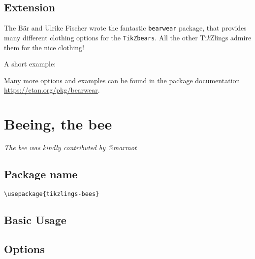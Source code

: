\documentclass[parskip=half]{scrartcl}
\newcommand{\tikzlings}{Ti\emph{k}Zlings\xspace}
\begin{document}
\subsection{Extension}

The B\"ar and Ulrike Fischer wrote the fantastic \lstinline|bearwear| package, that provides many different clothing options for the \lstinline|TikZbears|. All the other \tikzlings admire them for the nice clothing!

A short example:

\begin{tcblisting}{}
\bear
\bearwear[
  long sleeves, 
  shirt=red!80!black
]
\end{tcblisting}

Many more options and examples can be found in the package documentation \url{https://ctan.org/pkg/bearwear}. 

%
%
\clearpage
\section[Bee]{Beeing, the bee}

\emph{The bee was kindly contributed by @marmot}

\subsection{Package name}

\begin{tcolorbox}[lower separated=false, lefthand width=.8\linewidth]
\vspace*{0.5cm}
\lstinline|\usepackage{tikzlings-bees}| 
\vspace*{0.5cm}
\end{tcolorbox}

\subsection{Basic Usage}

\begin{tcblisting}{}
\bee
\end{tcblisting}

\subsection{Options}
\end{document}
